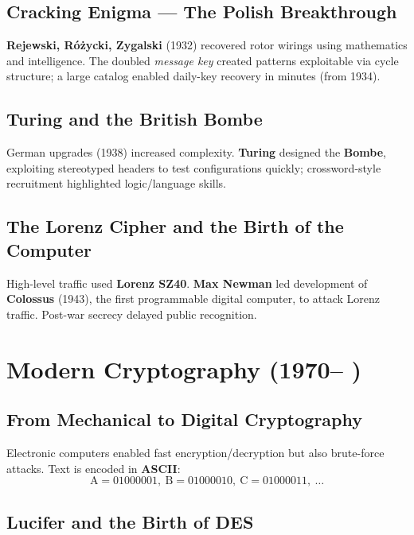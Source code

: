 \subsection{Cracking Enigma — The Polish Breakthrough}

\textbf{Rejewski, Różycki, Zygalski} (1932) recovered rotor wirings using mathematics and intelligence. The doubled \emph{message key} created patterns exploitable via cycle structure; a large catalog enabled daily-key recovery in minutes (from 1934).

\subsection{Turing and the British Bombe}

German upgrades (1938) increased complexity. \textbf{Turing} designed the \textbf{Bombe}, exploiting stereotyped headers to test configurations quickly; crossword-style recruitment highlighted logic/language skills.

\subsection{The Lorenz Cipher and the Birth of the Computer}

High-level traffic used \textbf{Lorenz SZ40}. \textbf{Max Newman} led development of \textbf{Colossus} (1943), the first programmable digital computer, to attack Lorenz traffic. Post-war secrecy delayed public recognition.

\section{Modern Cryptography (1970– )}

\subsection{From Mechanical to Digital Cryptography}

Electronic computers enabled fast encryption/decryption but also brute-force attacks. Text is encoded in \textbf{ASCII}:
\[
\text{A}=01000001,\ \text{B}=01000010,\ \text{C}=01000011,\ \ldots
\]

\subsection{Lucifer and the Birth of DES}

